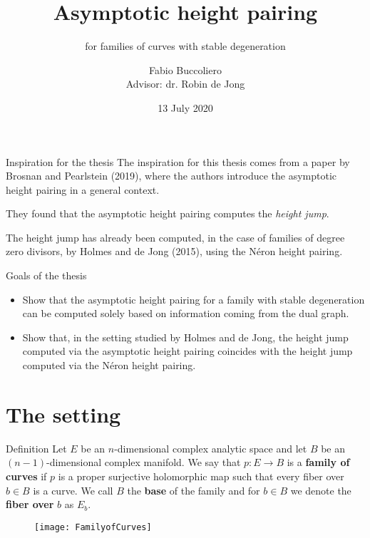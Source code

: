 \documentclass{beamer}
\title%
{Asymptotic height pairing}
\subtitle{for families of curves with stable degeneration}
\author %
{Fabio Buccoliero \\
 {\footnotesize Advisor: dr. Robin de Jong}}
\institute[Algant Master Program] %
{
	Algant Master thesis\\
	Milan University - Leiden University
}
\date %
{13 July 2020}
\begin{document}
	
\begin{frame}
	\titlepage
\end{frame}

\begin{frame}{Inspiration for the thesis}
The inspiration for this thesis comes from a paper by Brosnan and Pearlstein (2019), where the authors introduce the asymptotic height pairing in a general context.\vspace{1 em}

They found that the asymptotic height pairing computes the \emph{height jump}.\vspace{1 em}

The height jump has already been computed, in the case of families of degree zero divisors, by Holmes and de Jong (2015), using the N{é}ron height pairing. %
\end{frame}

\begin{frame}{Goals of the thesis}
\begin{itemize}
	\item Show that the asymptotic height pairing for a family with stable degeneration can be computed solely based on information coming from the dual graph.\vspace{1 em}
	\pause
	\item Show that, in the setting studied by Holmes and de Jong, the height jump computed via the asymptotic height pairing coincides with the height jump computed via the N{é}ron height pairing.
\end{itemize}
\end{frame}

\begin{frame}
\tableofcontents
\end{frame}

\section{The setting}
\begin{frame}
\begin{block}{Definition}
	Let $E$ be an $n$-dimensional complex analytic space and let $B$ be an $(n-1)$-dimensional complex manifold. We say that $p\colon E \rightarrow B$ is a \textbf{family of curves} if $p$ is a proper surjective holomorphic map such that every fiber over $b \in B$ is a curve. We call $B$ the \textbf{base} of the family and for $b \in B$ we denote the \textbf{fiber over} $b$ as $E_b.$
\end{block}
\begin{figure}
	\centering
	\texttt{[image: FamilyofCurves]}
\end{figure}
\end{frame}
\end{document}
